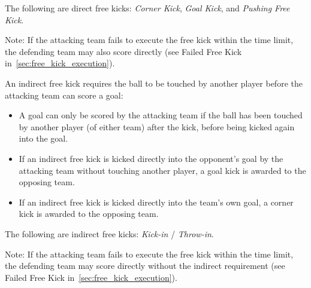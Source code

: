 The following are direct free kicks: \emph{Corner Kick}, \emph{Goal Kick}, and \emph{Pushing Free Kick}.

Note: If the attacking team fails to execute the free kick within the time limit, the defending team may also score directly (see Failed Free Kick in~\cref{sec:free_kick_execution}).

\label{sec:indirect_free_kick}

An indirect free kick requires the ball to be touched by another player before the attacking team can score a goal:
\begin{itemize}
  \item A goal can only be scored by the attacking team if the ball has been touched by another player (of either team) after the kick, before being kicked again into the goal.
  \item If an indirect free kick is kicked directly into the opponent's goal by the attacking team without touching another player, a goal kick is awarded to the opposing team.
  \item If an indirect free kick is kicked directly into the team's own goal, a corner kick is awarded to the opposing team.
\end{itemize}

The following are indirect free kicks: \emph{Kick-in} / \emph{Throw-in}.

Note: If the attacking team fails to execute the free kick within the time limit, the defending team may score directly without the indirect requirement (see Failed Free Kick in~\cref{sec:free_kick_execution}).





\label{sec:free_kick_execution}

